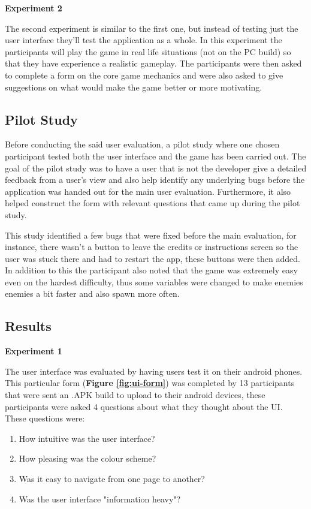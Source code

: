\documentclass{dissertation}
\begin{document}
\textbf{Experiment 2}

The second experiment is similar to the first one, but instead of testing just the user interface they'll test the application as a whole. In this experiment the participants will play the game in real life situations (not on the PC build) so that they have experience a realistic gameplay. The participants were then asked to complete a form on the core game mechanics and were also asked to give suggestions on what would make the game better or more motivating.

\subsection{Pilot Study}
Before conducting the said user evaluation, a pilot study where one chosen participant tested both the user interface and the game has been carried out. The goal of the pilot study was to have a user that is not the developer give a detailed feedback from a user's view and also help identify any underlying bugs before the application was handed out for the main user evaluation. Furthermore, it also helped construct the form with relevant questions that came up during the pilot study.

This study identified a few bugs that were fixed before the main evaluation, for instance, there wasn't a button to leave the credits or instructions screen so the user was stuck there and had to restart the app, these buttons were then added. In addition to this the participant also noted that the game was extremely easy even on the hardest difficulty, thus some variables were changed to make enemies enemies a bit faster and also spawn more often.

\subsection{Results}
\textbf{Experiment 1}

The user interface was evaluated by having users test it on their android phones. This particular form (\textbf{Figure \ref{fig:ui-form}}) was completed by 13 participants that were sent an .APK build to upload to their android devices, these participants were asked 4 questions about what they thought about the UI. These questions were: 

\begin{enumerate}
\item How intuitive was the user interface?
\item How pleasing was the colour scheme?
\item Was it easy to navigate from one page to another?
\item Was the user interface "information heavy"?
\end{enumerate}
\end{document}
